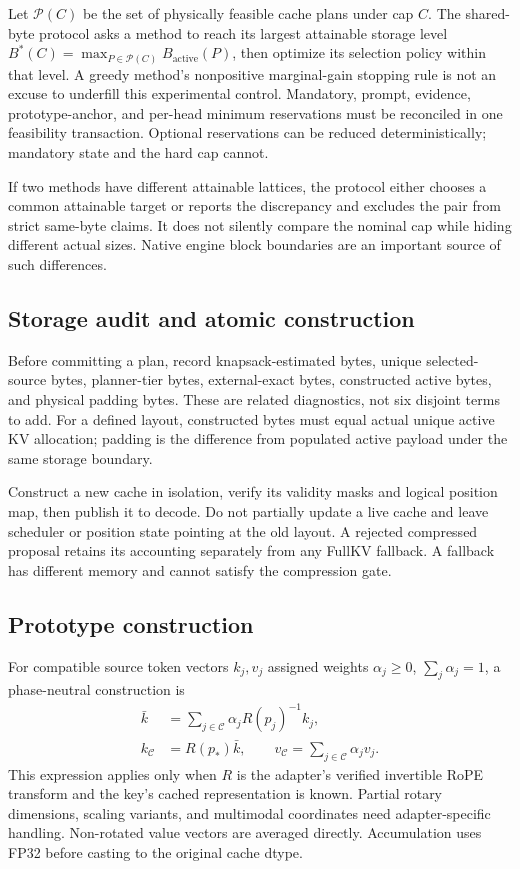 Let $\mathcal P(C)$ be the set of physically feasible cache plans under cap $C$.
The shared-byte protocol asks a method to reach its largest attainable storage
level $B^*(C)=\max_{P\in\mathcal P(C)}B_{\mathrm{active}}(P)$, then optimize its
selection policy within that level. A greedy method's nonpositive marginal-gain
stopping rule is not an excuse to underfill this experimental control.
Mandatory, prompt, evidence, prototype-anchor, and per-head minimum reservations
must be reconciled in one feasibility transaction. Optional reservations can
be reduced deterministically; mandatory state and the hard cap cannot.

If two methods have different attainable lattices, the protocol either chooses
a common attainable target or reports the discrepancy and excludes the pair
from strict same-byte claims. It does not silently compare the nominal cap
while hiding different actual sizes. Native engine block boundaries are an
important source of such differences.

\subsection{Storage audit and atomic construction}
Before committing a plan, record knapsack-estimated bytes, unique selected-source
bytes, planner-tier bytes, external-exact bytes, constructed active bytes, and
physical padding bytes. These are related diagnostics, not six disjoint terms
to add. For a defined layout, constructed bytes must equal actual unique
active KV allocation; padding is the difference from populated active payload
under the same storage boundary.

Construct a new cache in isolation, verify its validity masks and logical
position map, then publish it to decode. Do not partially update a live cache
and leave scheduler or position state pointing at the old layout. A rejected
compressed proposal retains its accounting separately from any FullKV fallback.
A fallback has different memory and cannot satisfy the compression gate.

\subsection{Prototype construction}
For compatible source token vectors $k_j,v_j$ assigned weights
$\alpha_j\ge0$, $\sum_j\alpha_j=1$, a phase-neutral construction is
\begin{align}
 \bar k&=\sum_{j\in\mathcal C}\alpha_j R(p_j)^{-1}k_j,\\
 k_{\mathcal C}&=R(p_*)\bar k,\qquad
 v_{\mathcal C}=\sum_{j\in\mathcal C}\alpha_j v_j.
\end{align}
This expression applies only when $R$ is the adapter's verified invertible
RoPE transform and the key's cached representation is known. Partial rotary
dimensions, scaling variants, and multimodal coordinates need adapter-specific
handling. Non-rotated value vectors are averaged directly. Accumulation uses
FP32 before casting to the original cache dtype.

